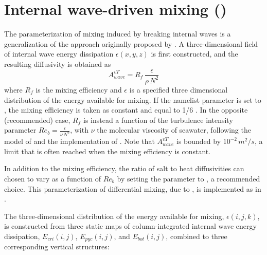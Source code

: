 \documentclass[../main/NEMO_manual]{subfiles}
\begin{document}
\section[Internal wave-driven mixing (\forcode{ln_zdfiwm})]{Internal wave-driven mixing (\protect{})}
\label{subsec:ZDF_tmx_new}

\begin{listing}
  \caption{}
  \label{lst:namzdf_iwm}
\end{listing}

The parameterization of mixing induced by breaking internal waves is a generalization of
the approach originally proposed by \citet{st-laurent.simmons.ea_GRL02}.
A three-dimensional field of internal wave energy dissipation $\epsilon(x,y,z)$ is first constructed,
and the resulting diffusivity is obtained as
\[
  A^{vT}_{wave} =  R_f \,\frac{ \epsilon }{ \rho \, N^2 }
\]
where $R_f$ is the mixing efficiency and $\epsilon$ is a specified three dimensional distribution of
the energy available for mixing.
If the  namelist parameter is set to , the mixing efficiency is taken as constant and
equal to 1/6 \citep{osborn_JPO80}.
In the opposite (recommended) case, $R_f$ is instead a function of
the turbulence intensity parameter $Re_b = \frac{ \epsilon}{\nu \, N^2}$,
with $\nu$ the molecular viscosity of seawater, following the model of \cite{bouffard.boegman_DAO13} and
the implementation of \cite{de-lavergne.madec.ea_JPO16}.
Note that $A^{vT}_{wave}$ is bounded by $10^{-2}\,m^2/s$, a limit that is often reached when
the mixing efficiency is constant.

In addition to the mixing efficiency, the ratio of salt to heat diffusivities can chosen to vary
as a function of $Re_b$ by setting the  parameter to , a recommended choice.
This parameterization of differential mixing, due to \cite{jackson.rehmann_JPO14},
is implemented as in \cite{de-lavergne.madec.ea_JPO16}.

The three-dimensional distribution of the energy available for mixing, $\epsilon(i,j,k)$,
is constructed from three static maps of column-integrated internal wave energy dissipation,
$E_{cri}(i,j)$, $E_{pyc}(i,j)$, and $E_{bot}(i,j)$, combined to three corresponding vertical structures:
\end{document}
